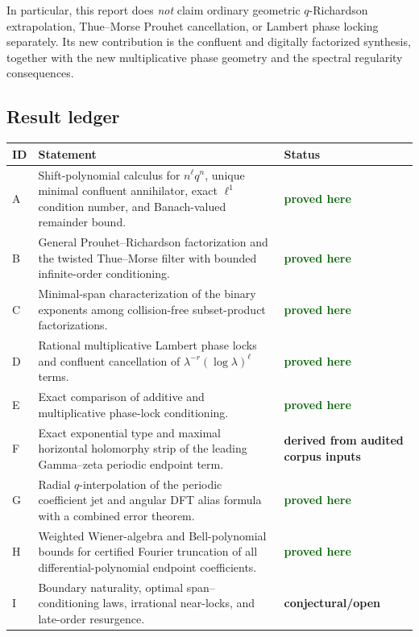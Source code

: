 \documentclass[11pt,oneside]{article}
\numberwithin{equation}{section}
\theoremstyle{definition}
\theoremstyle{remark}
\newcommand{\statusproved}{\textcolor{DarkGreen}{\textbf{proved here}}}
\newcommand{\statusderived}{\textcolor{DeepBlue}{\textbf{derived from audited corpus inputs}}}
\newcommand{\statusopen}{\textcolor{Burgundy}{\textbf{conjectural/open}}}
\begin{document}
In particular, this report does \emph{not} claim ordinary geometric $q$-Richardson
extrapolation, Thue--Morse Prouhet cancellation, or Lambert phase locking separately.  Its
new contribution is the confluent and digitally factorized synthesis, together with the
new multiplicative phase geometry and the spectral regularity consequences.

\subsection{Result ledger}

\small
\begin{longtable}{@{}>{\raggedright\arraybackslash}p{}>{\raggedright\arraybackslash}p{}>{\raggedright\arraybackslash}p{}@{}}
\toprule
ID & Statement & Status\\
\midrule
\endhead
A & Shift-polynomial calculus for $n^\ell q^n$, unique minimal confluent
annihilator, exact $\ell^1$ condition number, and Banach-valued remainder bound.
& \statusproved\\
B & General Prouhet--Richardson factorization and the twisted Thue--Morse filter
with bounded infinite-order conditioning. & \statusproved\\
C & Minimal-span characterization of the binary exponents among collision-free
subset-product factorizations. & \statusproved\\
D & Rational multiplicative Lambert phase locks and confluent cancellation of
$\lambda^{-r}(\log\lambda)^\ell$ terms. & \statusproved\\
E & Exact comparison of additive and multiplicative phase-lock conditioning.
& \statusproved\\
F & Exact exponential type and maximal horizontal holomorphy strip of the leading
Gamma--zeta periodic endpoint term. & \statusderived\\
G & Radial $q$-interpolation of the periodic coefficient jet and angular DFT
alias formula with a combined error theorem. & \statusproved\\
H & Weighted Wiener-algebra and Bell-polynomial bounds for certified Fourier
truncation of all differential-polynomial endpoint coefficients. & \statusproved\\
I & Boundary naturality, optimal span--conditioning laws, irrational near-locks,
and late-order resurgence. & \statusopen\\
\bottomrule
\end{longtable}
\end{document}
